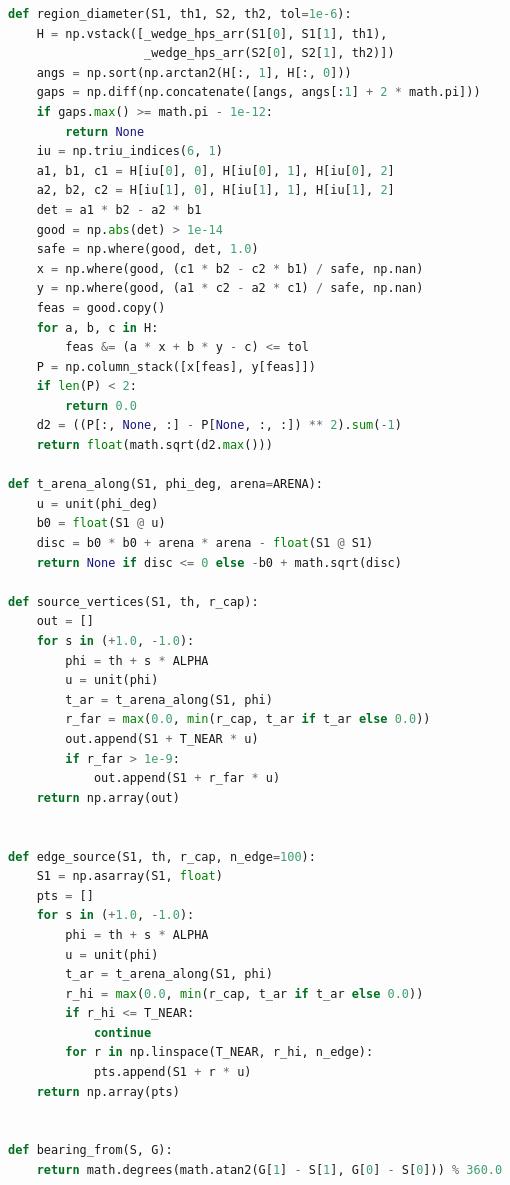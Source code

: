 \documentclass[withoutpreface,bwprint]{cumcmthesis} %
\begin{document}
\begin{appendices}
\begin{lstlisting}[language=python]
def region_diameter(S1, th1, S2, th2, tol=1e-6):
    H = np.vstack([_wedge_hps_arr(S1[0], S1[1], th1),
                   _wedge_hps_arr(S2[0], S2[1], th2)])
    angs = np.sort(np.arctan2(H[:, 1], H[:, 0]))
    gaps = np.diff(np.concatenate([angs, angs[:1] + 2 * math.pi]))
    if gaps.max() >= math.pi - 1e-12:
        return None
    iu = np.triu_indices(6, 1)
    a1, b1, c1 = H[iu[0], 0], H[iu[0], 1], H[iu[0], 2]
    a2, b2, c2 = H[iu[1], 0], H[iu[1], 1], H[iu[1], 2]
    det = a1 * b2 - a2 * b1
    good = np.abs(det) > 1e-14
    safe = np.where(good, det, 1.0)
    x = np.where(good, (c1 * b2 - c2 * b1) / safe, np.nan)
    y = np.where(good, (a1 * c2 - a2 * c1) / safe, np.nan)
    feas = good.copy()
    for a, b, c in H:
        feas &= (a * x + b * y - c) <= tol
    P = np.column_stack([x[feas], y[feas]])
    if len(P) < 2:
        return 0.0
    d2 = ((P[:, None, :] - P[None, :, :]) ** 2).sum(-1)
    return float(math.sqrt(d2.max()))

def t_arena_along(S1, phi_deg, arena=ARENA):
    u = unit(phi_deg)
    b0 = float(S1 @ u)
    disc = b0 * b0 + arena * arena - float(S1 @ S1)
    return None if disc <= 0 else -b0 + math.sqrt(disc)

def source_vertices(S1, th, r_cap):
    out = []
    for s in (+1.0, -1.0):
        phi = th + s * ALPHA
        u = unit(phi)
        t_ar = t_arena_along(S1, phi)
        r_far = max(0.0, min(r_cap, t_ar if t_ar else 0.0))
        out.append(S1 + T_NEAR * u)
        if r_far > 1e-9:
            out.append(S1 + r_far * u)
    return np.array(out)


def edge_source(S1, th, r_cap, n_edge=100):
    S1 = np.asarray(S1, float)
    pts = []
    for s in (+1.0, -1.0):
        phi = th + s * ALPHA
        u = unit(phi)
        t_ar = t_arena_along(S1, phi)
        r_hi = max(0.0, min(r_cap, t_ar if t_ar else 0.0))
        if r_hi <= T_NEAR:
            continue
        for r in np.linspace(T_NEAR, r_hi, n_edge):
            pts.append(S1 + r * u)
    return np.array(pts)


def bearing_from(S, G):
    return math.degrees(math.atan2(G[1] - S[1], G[0] - S[0])) % 360.0


\end{lstlisting}
\end{appendices}
\end{document}

